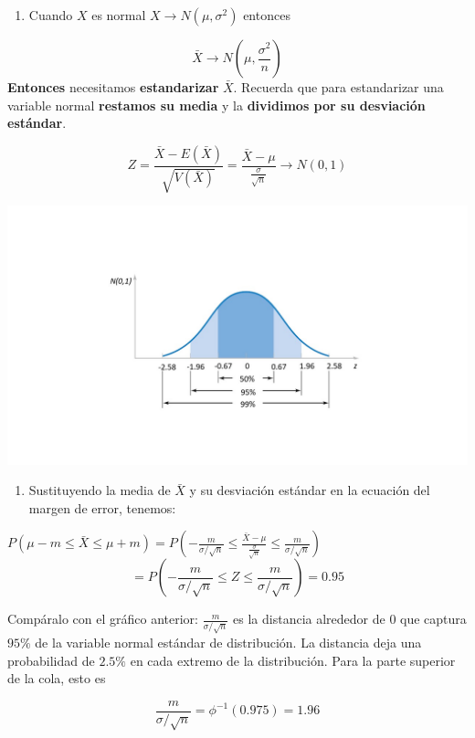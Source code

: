 \documentclass[
]{book}
\providecommand{\tightlist}{%
  \setlength{\itemsep}{0pt}\setlength{\parskip}{0pt}}
\begin{document}
\begin{enumerate}
\def\labelenumi{\arabic{enumi}.}
\tightlist
\item
  Cuando \(X\) es normal \(X \rightarrow N(\mu, \sigma^2)\) entonces
\end{enumerate}

\[\bar{X} \rightarrow N(\mu, \frac{\sigma^2}{n})\]
\textbf{Entonces} necesitamos \textbf{estandarizar} \(\bar{X}\). Recuerda que para estandarizar una variable normal \textbf{restamos su media} y la \textbf{dividimos por su desviación estándar}.

\[Z=\frac{\bar{X}-E(\bar{X})}{\sqrt{V(\bar{X})}} =\frac{\bar{X}-\mu}{ \frac{\sigma}{\sqrt{n}}} \rightarrow N(0,1)\]

\includegraphics{./figures/phi.JPG}

\begin{enumerate}
\def\labelenumi{\arabic{enumi}.}
\setcounter{enumi}{1}
\tightlist
\item
  Sustituyendo la media de \(\bar{X}\) y su desviación estándar en la ecuación del margen de error, tenemos:
\end{enumerate}

\(P(\mu-m \leq \bar{X} \leq\mu + m)=P(-\frac{m}{\sigma/\sqrt{n}} \leq \frac{\bar{X} -\mu}{\frac{\sigma}{\sqrt{n}}}\leq\frac{m}{\sigma/\sqrt{n}})\)
\[=P(-\frac{m}{\sigma/\sqrt{n}} \leq Z \leq\frac{m}{\sigma/\sqrt{n}})=0.95\]

Compáralo con el gráfico anterior: \(\frac{m}{\sigma/\sqrt{n}}\) es la distancia alrededor de \(0\) que captura \(95\%\) de la variable normal estándar de distribución. La distancia deja una probabilidad de \(2.5\%\) en cada extremo de la distribución. Para la parte superior de la cola, esto es

\[\frac{m}{\sigma/\sqrt{n}}=\phi^{-1}(0.975)=1.96\]
\end{document}
